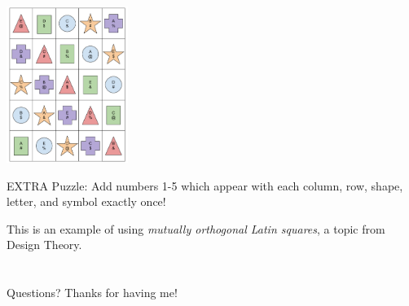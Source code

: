 \documentclass{beamer}
\theoremstyle{theorem}
\theoremstyle{definition}
\newcommand{\<}{\langle}
\renewcommand{\>}{\rangle}
\newcommand{\vpause}{\pause\vspace{1em}}
\begin{document}
\begin{frame}\small
  \centerline{\includegraphics[height=2in]{safeAndSecuredSol.pdf}}

  \pause

  EXTRA Puzzle: Add numbers 1-5 which appear with each column, row,
  shape, letter, and symbol exactly once!

  \vpause

  This is an example of using \textit{mutually orthogonal
  Latin squares}, a topic from Design Theory.
\end{frame}

\section*{}

\begin{frame}
Questions? Thanks for having me!
\end{frame}
\end{document}
